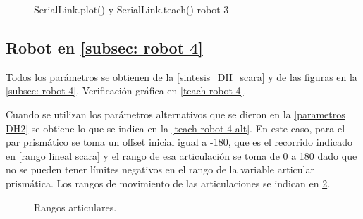 \documentclass[a4paper,12pt]{article}
\begin{document}
\begin{figure}[htpb]
    \centering
    \begin{adjustbox}{scale = 0.9, max width=\columnwidth}
    \end{adjustbox}
    \caption{SerialLink.plot() y SerialLink.teach() robot 3}
    \label{teach robot 3}
\end{figure}

\subsection{Robot en \cref{subsec: robot 4}}
Todos los parámetros se obtienen de la \cref{sintesis_DH_scara}
y de las figuras en la \cref{subsec: robot 4}. Verificación gráfica en \cref{teach robot 4}.

Cuando se utilizan los parámetros alternativos que se dieron en la \cref{parametros DH2}
se obtiene lo que se indica en la \cref{teach robot 4 alt}.
En este caso, para el par prismático se toma un offset inicial igual a -180, que es el recorrido indicado en
\cref{rango lineal scara} y el rango de esa articulación se toma de 0 a 180 dado que no se pueden tener límites negativos en el rango de la variable articular prismática.
Los rangos de movimiento de las articulaciones se indican en \cref{rangos scara}.


\begin{figure}[htpb]
    \centering
    \begin{adjustbox}{scale = 0.8, max width=\columnwidth}
    \end{adjustbox}
    \caption{Rangos articulares.}
    \label{rangos scara}
\end{figure}
\end{document}

